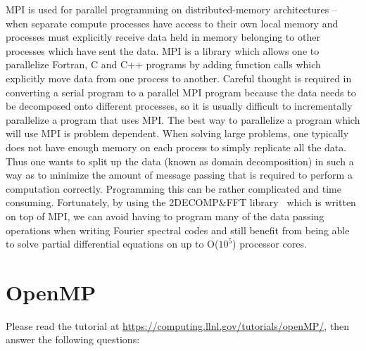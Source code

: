 MPI is used for parallel programming on distributed-memory architectures -- when separate compute processes have access to their own local memory and processes must explicitly receive data held in memory belonging to other processes which have sent the data. MPI is a library which allows one to parallelize Fortran, C and C++ programs by adding function calls which explicitly move data from one process to another. Careful thought is required in converting a serial program to a parallel MPI program because the data needs to be decomposed onto different processes, so it is usually difficult to incrementally parallelize a program that uses MPI. The best way to parallelize a program which will use MPI is problem dependent. When solving large problems, one typically does not have enough memory on each process to simply replicate all the data. Thus one wants to split up the data (known as domain decomposition) in such a way as to minimize the amount of message passing that is required to perform a computation correctly. Programming this can be rather complicated and time consuming. Fortunately, by using the 2DECOMP{\&}FFT library~\cite{LiLai10,LaiLi11} which is written on top of MPI, we can avoid having to program many of the data passing operations when writing Fourier spectral codes and still benefit from being able to solve partial differential equations on up to O($10^5$) processor cores.

\section{OpenMP}
Please read the tutorial at \url{https://computing.llnl.gov/tutorials/openMP/}, then answer the following questions:

